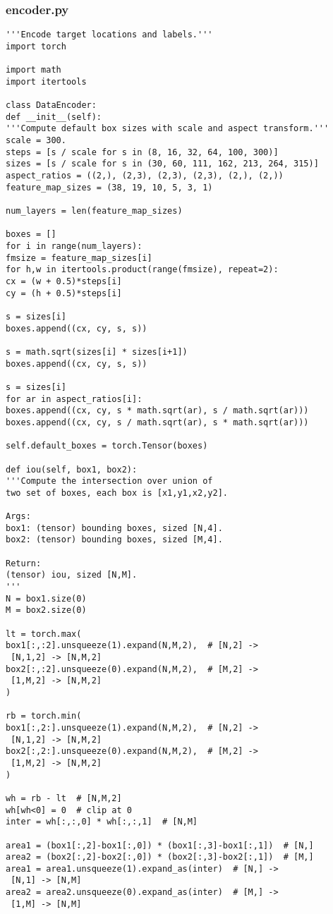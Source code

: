 \subsubsection*{encoder.py}
\begin{lstlisting}
'''Encode target locations and labels.'''
import torch

import math
import itertools

class DataEncoder:
def __init__(self):
'''Compute default box sizes with scale and aspect transform.'''
scale = 300.
steps = [s / scale for s in (8, 16, 32, 64, 100, 300)]
sizes = [s / scale for s in (30, 60, 111, 162, 213, 264, 315)]
aspect_ratios = ((2,), (2,3), (2,3), (2,3), (2,), (2,))
feature_map_sizes = (38, 19, 10, 5, 3, 1)

num_layers = len(feature_map_sizes)

boxes = []
for i in range(num_layers):
fmsize = feature_map_sizes[i]
for h,w in itertools.product(range(fmsize), repeat=2):
cx = (w + 0.5)*steps[i]
cy = (h + 0.5)*steps[i]

s = sizes[i]
boxes.append((cx, cy, s, s))

s = math.sqrt(sizes[i] * sizes[i+1])
boxes.append((cx, cy, s, s))

s = sizes[i]
for ar in aspect_ratios[i]:
boxes.append((cx, cy, s * math.sqrt(ar), s / math.sqrt(ar)))
boxes.append((cx, cy, s / math.sqrt(ar), s * math.sqrt(ar)))

self.default_boxes = torch.Tensor(boxes)

def iou(self, box1, box2):
'''Compute the intersection over union of 
two set of boxes, each box is [x1,y1,x2,y2].

Args:
box1: (tensor) bounding boxes, sized [N,4].
box2: (tensor) bounding boxes, sized [M,4].

Return:
(tensor) iou, sized [N,M].
'''
N = box1.size(0)
M = box2.size(0)

lt = torch.max(
box1[:,:2].unsqueeze(1).expand(N,M,2),  # [N,2] ->
 [N,1,2] -> [N,M,2]
box2[:,:2].unsqueeze(0).expand(N,M,2),  # [M,2] ->
 [1,M,2] -> [N,M,2]
)

rb = torch.min(
box1[:,2:].unsqueeze(1).expand(N,M,2),  # [N,2] ->
 [N,1,2] -> [N,M,2]
box2[:,2:].unsqueeze(0).expand(N,M,2),  # [M,2] ->
 [1,M,2] -> [N,M,2]
)

wh = rb - lt  # [N,M,2]
wh[wh<0] = 0  # clip at 0
inter = wh[:,:,0] * wh[:,:,1]  # [N,M]

area1 = (box1[:,2]-box1[:,0]) * (box1[:,3]-box1[:,1])  # [N,]
area2 = (box2[:,2]-box2[:,0]) * (box2[:,3]-box2[:,1])  # [M,]
area1 = area1.unsqueeze(1).expand_as(inter)  # [N,] ->
 [N,1] -> [N,M]
area2 = area2.unsqueeze(0).expand_as(inter)  # [M,] ->
 [1,M] -> [N,M]


\end{lstlisting}
